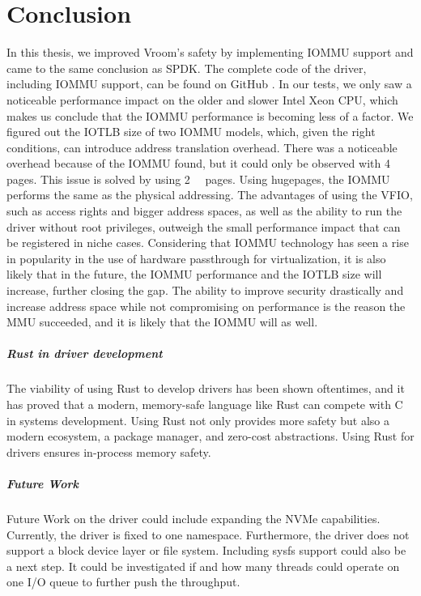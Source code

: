 \chapter{Conclusion}
In this thesis, we improved Vroom's safety by implementing IOMMU support and came to the same conclusion as SPDK. The complete code of the driver, including IOMMU support, can be found on GitHub \cite{vroomsource}.
In our tests, we only saw a noticeable performance impact on the older and slower Intel Xeon CPU, which makes us conclude that the IOMMU performance is becoming less of a factor.
We figured out the IOTLB size of two IOMMU models, which, given the right conditions, can introduce address translation overhead.
There was a noticeable overhead because of the IOMMU found, but it could only be observed with \qty{4}{\kibi\byte} pages. This issue is solved by using \qty{2}{\mebi\byte} pages. Using hugepages, the IOMMU performs the same as the physical addressing.
The advantages of using the VFIO, such as access rights and bigger address spaces, as well as the ability to run the driver without root privileges, outweigh the small performance impact that can be registered in niche cases.
Considering that IOMMU technology has seen a rise in popularity in the use of hardware passthrough for virtualization, it is also likely that in the future, the IOMMU performance and the IOTLB size will increase, further closing the gap. The ability to improve security drastically and increase address space while not compromising on performance is the reason the MMU succeeded, and it is likely that the IOMMU will as well.

\paragraph{Rust in driver development}
The viability of using Rust to develop drivers has been shown oftentimes, and it has proved that a modern, memory-safe language like Rust can compete with C in systems development. Using Rust not only provides more safety but also a modern ecosystem, a package manager, and zero-cost abstractions. Using Rust for drivers ensures in-process memory safety.

\paragraph{Future Work}
Future Work on the driver could include expanding the NVMe capabilities. Currently, the driver is fixed to one namespace. Furthermore, the driver does not support a block device layer or file system. Including sysfs support could also be a next step.
It could be investigated if and how many threads could operate on one I/O queue to further push the throughput.